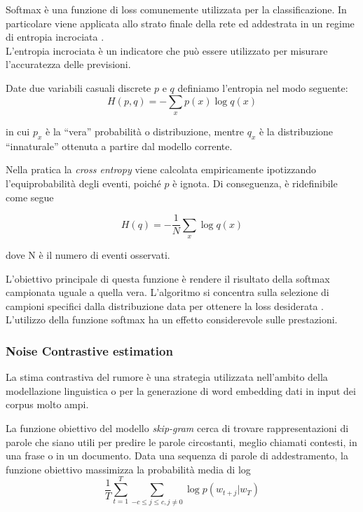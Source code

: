 Softmax è una funzione di loss comunemente utilizzata per la classificazione. In particolare viene applicata allo strato finale della rete ed addestrata in un regime di entropia incrociata \cite{tang2013deep}.\\
L'entropia incrociata è un indicatore che può essere utilizzato per misurare l'accuratezza delle previsioni. 

Date due variabili casuali discrete $p$ e $q$ definiamo l'entropia nel modo seguente:
\begin{equation}
	H(p,q)=-\sum_{x} p(x) \log q(x)
\end{equation}

in cui $p_{x}$ è la ``vera'' probabilità o distribuzione, mentre $q_{x}$ è la distribuzione ``innaturale'' ottenuta a partire dal modello corrente.

Nella pratica la \emph{cross entropy} viene calcolata empiricamente ipotizzando l'equiprobabilità degli eventi, poiché $p$ è ignota. 
Di conseguenza, è ridefinibile come segue

\begin{equation}
H(q)=-\frac{1}{N}\sum_{x} \log q(x)
\end{equation}

dove N è il numero di eventi osservati.

L'obiettivo principale di questa funzione è rendere il risultato della softmax campionata uguale a quella vera. L'algoritmo si concentra sulla selezione di campioni specifici dalla distribuzione data per ottenere la loss desiderata \cite{liu2016large}.  
L'utilizzo della funzione softmax ha un effetto considerevole sulle prestazioni. 

\subsubsection{Noise Contrastive estimation}
\label{subsubsec:nce}

La stima contrastiva del rumore è una strategia utilizzata nell'ambito della modellazione linguistica o per la generazione di word embedding dati in input dei corpus molto ampi.

La funzione obiettivo del modello \emph{skip-gram} cerca di trovare rappresentazioni di parole che siano utili per predire le parole circostanti, meglio chiamati contesti, in una frase o in un documento. 
Data una sequenza di parole di addestramento, la funzione obiettivo massimizza la probabilità media di log
\begin{equation}
\frac{1}{T}\sum_{t=1}^{T} \sum_{-c \leq j \leq c, j \neq 0} \log p(w_{t+j} | w_T)
\end{equation}

